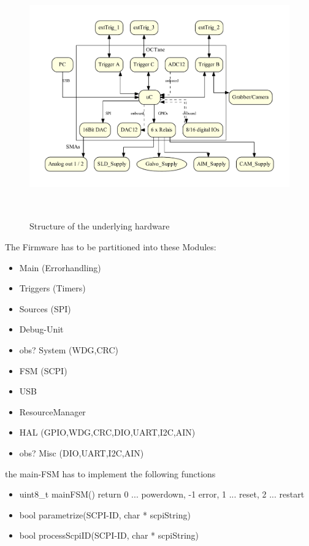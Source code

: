 		\begin{figure}[ht]
			\centering
			\includegraphics[height=105mm]{src/_Octane_HW-Structure.pdf}
			\caption{Structure of the underlying hardware}
			\label{_Octane_HW-Structure.pdf}
		\end{figure}


	{ The Firmware has to be partitioned into these Modules:
		\begin{itemize}
		\item Main (Errorhandling)
		\item Triggers	(Timers)
		\item Sources	(SPI)
		\item Debug-Unit
		\item obs? System (WDG,CRC) 
		\item FSM (SCPI) 
		\item USB
		\item ResourceManager
		\item HAL (GPIO,WDG,CRC,DIO,UART,I2C,AIN)
		\item obs? Misc	(DIO,UART,I2C,AIN)
		\end{itemize}
	}

	{	the main-FSM has to implement the following functions
		\begin{itemize}
			\item 	uint8_t mainFSM() return 0 ... powerdown, -1 error, 1 ... reset, 2 ... restart
			\item 	bool parametrize(SCPI-ID, char * scpiString)
			\item 	bool processScpiID(SCPI-ID, char * scpiString)
		\end{itemize}
	}

